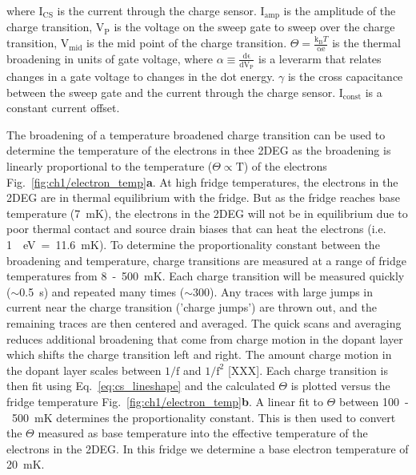 where $\mathrm{I_{CS}}$ is the current through the charge sensor. $\mathrm{I_{amp}}$ is the amplitude of the charge transition, $\mathrm{V_{P}}$ is the voltage on the sweep gate to sweep over the charge transition, $\mathrm{V_{mid}}$ is the mid point of the charge transition. $\Theta=\frac{\mathrm{k_B}T}{\mathrm{\alpha e}}$ is the thermal broadening in units of gate voltage, where $\alpha \equiv \frac{\mathrm{d\epsilon}}{\mathrm{dV_P}}$ is a leverarm that relates changes in a gate voltage to changes in the dot energy. $\gamma$ is the cross capacitance between the sweep gate and the current through the charge sensor. $\mathrm{I_{const}}$ is a constant current offset.

The broadening of a temperature broadened charge transition can be used to determine the temperature of the electrons in thee 2DEG as the broadening is linearly proportional to the temperature ($\Theta\propto\mathrm{T}$) of the electrons Fig.~\ref{fig:ch1/electron_temp}\textbf{a}. At high fridge temperatures, the electrons in the 2DEG are in thermal equilibrium with the fridge. But as the fridge reaches base temperature (\qty{7}{mK}), the electrons in the 2DEG will not be in equilibrium due to poor thermal contact and source drain biases that can heat the electrons (i.e. \qty{1}{\mu eV}~=~\qty{11.6}{mK}). 
To determine the proportionality constant between the broadening and temperature, charge transitions are measured at a range of fridge temperatures from \qty{8}{}~-~\qty{500}{mK}. Each charge transition will be measured quickly ($\sim$\qty{0.5}{s}) and repeated many times ($\sim300$). Any traces with large jumps in current near the charge transition ('charge jumps') are thrown out, and the remaining traces are then centered and averaged. The quick scans and averaging reduces additional broadening that come from charge motion in the dopant layer which shifts the charge transition left and right. The amount charge motion in the dopant layer scales between $\mathrm{1/f}$ and $\mathrm{1/f^2}$ [XXX]. Each charge transition is then fit using Eq.~\ref{eq:cs_lineshape} and the calculated $\Theta$ is plotted versus the fridge temperature Fig.~\ref{fig:ch1/electron_temp}\textbf{b}. A linear fit to $\Theta$ between \qty{100}{}~-~\qty{500}{mK} determines the proportionality constant. This is then used to convert the $\Theta$ measured as base temperature into the effective temperature of the electrons in the 2DEG. In this fridge we determine a base electron temperature of \qty{20}{mK}.


